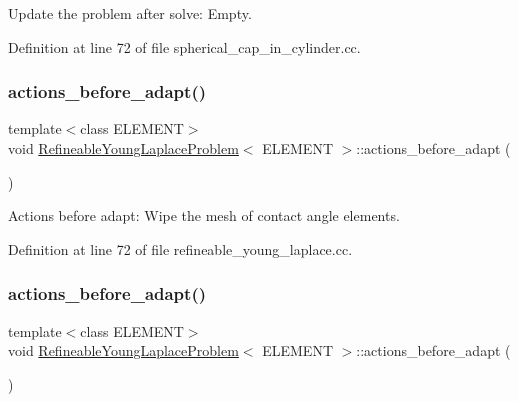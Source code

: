 Update the problem after solve\+: Empty. 



Definition at line 72 of file spherical\+\_\+cap\+\_\+in\+\_\+cylinder.\+cc.

\mbox{\label{classRefineableYoungLaplaceProblem_ab64eb0b58beb3bb096ecc81b1a3f8a4f}} 
\subsubsection{\texorpdfstring{actions\+\_\+before\+\_\+adapt()}{actions\_before\_adapt()}\hspace{0.1cm}{\footnotesize\ttfamily [1/2]}}
{\footnotesize\ttfamily template$<$class E\+L\+E\+M\+E\+NT$>$ \\
void \hyperlink{classRefineableYoungLaplaceProblem}{Refineable\+Young\+Laplace\+Problem}$<$ E\+L\+E\+M\+E\+NT $>$\+::actions\+\_\+before\+\_\+adapt (\begin{DoxyParamCaption}{ }\end{DoxyParamCaption})\hspace{0.3cm}{\ttfamily [inline]}}



Actions before adapt\+: Wipe the mesh of contact angle elements. 



Definition at line 72 of file refineable\+\_\+young\+\_\+laplace.\+cc.

\mbox{\label{classRefineableYoungLaplaceProblem_ab64eb0b58beb3bb096ecc81b1a3f8a4f}} 
\subsubsection{\texorpdfstring{actions\+\_\+before\+\_\+adapt()}{actions\_before\_adapt()}\hspace{0.1cm}{\footnotesize\ttfamily [2/2]}}
{\footnotesize\ttfamily template$<$class E\+L\+E\+M\+E\+NT$>$ \\
void \hyperlink{classRefineableYoungLaplaceProblem}{Refineable\+Young\+Laplace\+Problem}$<$ E\+L\+E\+M\+E\+NT $>$\+::actions\+\_\+before\+\_\+adapt (\begin{DoxyParamCaption}{ }\end{DoxyParamCaption})\hspace{0.3cm}{\ttfamily [inline]}}



